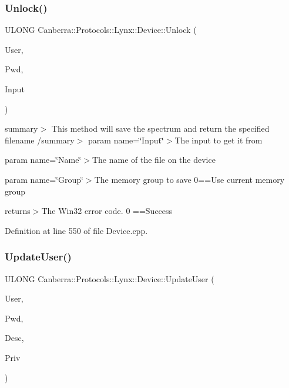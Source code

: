 \subsubsection{\texorpdfstring{Unlock()}{Unlock()}}
{\footnotesize\ttfamily U\+L\+O\+NG Canberra\+::\+Protocols\+::\+Lynx\+::\+Device\+::\+Unlock (\begin{DoxyParamCaption}\item[{const \hyperlink{class_canberra_1_1_utility_1_1_core_1_1_string}{Canberra\+::\+Utility\+::\+Core\+::\+String} \&}]{User,  }\item[{const \hyperlink{class_canberra_1_1_utility_1_1_core_1_1_string}{Canberra\+::\+Utility\+::\+Core\+::\+String} \&}]{Pwd,  }\item[{U\+S\+H\+O\+RT}]{Input }\end{DoxyParamCaption})}

summary$>$ This method will save the spectrum and return the specified filename /summary$>$ param name=\char`\"{}\+Input\char`\"{}$>$The input to get it from

param name=\char`\"{}\+Name\char`\"{}$>$The name of the file on the device

param name=\char`\"{}\+Group\char`\"{}$>$The memory group to save 0==Use current memory group

returns$>$The Win32 error code. 0 ==Success

Definition at line 550 of file Device.\+cpp.

\mbox{\label{class_canberra_1_1_protocols_1_1_lynx_1_1_device_a47051ab0ec0a01f2b0f56925d12d10df_a47051ab0ec0a01f2b0f56925d12d10df}} 
\subsubsection{\texorpdfstring{Update\+User()}{UpdateUser()}}
{\footnotesize\ttfamily U\+L\+O\+NG Canberra\+::\+Protocols\+::\+Lynx\+::\+Device\+::\+Update\+User (\begin{DoxyParamCaption}\item[{const \hyperlink{class_canberra_1_1_utility_1_1_core_1_1_string}{Canberra\+::\+Utility\+::\+Core\+::\+String} \&}]{User,  }\item[{const \hyperlink{class_canberra_1_1_utility_1_1_core_1_1_string}{Canberra\+::\+Utility\+::\+Core\+::\+String} \&}]{Pwd,  }\item[{const \hyperlink{class_canberra_1_1_utility_1_1_core_1_1_string}{Canberra\+::\+Utility\+::\+Core\+::\+String} \&}]{Desc,  }\item[{L\+O\+NG}]{Priv }\end{DoxyParamCaption})}

